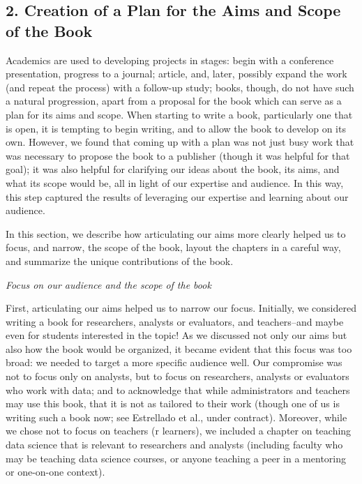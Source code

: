 \documentclass[
  english,
  man]{apa6}
\begin{document}
\hypertarget{creation-of-a-plan-for-the-aims-and-scope-of-the-book}{%
\subsection{2. Creation of a Plan for the Aims and Scope of the Book}\label{creation-of-a-plan-for-the-aims-and-scope-of-the-book}}

Academics are used to developing projects in stages: begin with a conference presentation, progress to a journal; article, and, later, possibly expand the work (and repeat the process) with a follow-up study; books, though, do not have such a natural progression, apart from a proposal for the book which can serve as a plan for its aims and scope. When starting to write a book, particularly one that is open, it is tempting to begin writing, and to allow the book to develop on its own. However, we found that coming up with a plan was not just busy work that was necessary to propose the book to a publisher (though it was helpful for that goal); it was also helpful for clarifying our ideas about the book, its aims, and what its scope would be, all in light of our expertise and audience. In this way, this step captured the results of leveraging our expertise and learning about our audience.

In this section, we describe how articulating our aims more clearly helped us to focus, and narrow, the scope of the book, layout the chapters in a careful way, and summarize the unique contributions of the book.

\emph{Focus on our audience and the scope of the book}

First, articulating our aims helped us to narrow our focus. Initially, we considered writing a book for researchers, analysts or evaluators, and teachers--and maybe even for students interested in the topic! As we discussed not only our aims but also how the book would be organized, it became evident that this focus was too broad: we needed to target a more specific audience well. Our compromise was not to focus only on analysts, but to focus on researchers, analysts or evaluators who work with data; and to acknowledge that while administrators and teachers may use this book, that it is not as tailored to their work (though one of us is writing such a book now; see Estrellado et al., under contract). Moreover, while we chose not to focus on teachers (r learners), we included a chapter on teaching data science that is relevant to researchers and analysts (including faculty who may be teaching data science courses, or anyone teaching a peer in a mentoring or one-on-one context).
\end{document}
